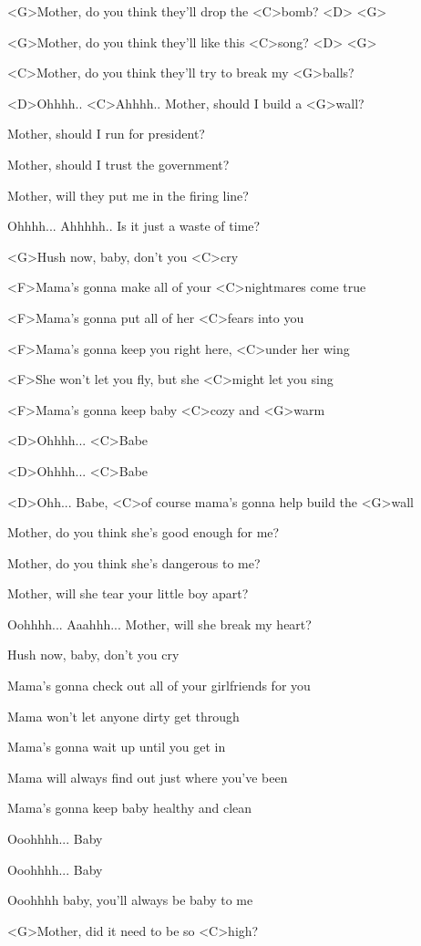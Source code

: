 
\zs
<G>Mother, do you think they'll drop the <C>bomb? <D> <G>

<G>Mother, do you think they'll like this <C>song? <D> <G> 

<C>Mother, do you think they'll try to break my <G>balls?

<D>Ohhhh.. <C>Ahhhh.. Mother, should I build a <G>wall?
\ks

\zs
Mother, should I run for president?

Mother, should I trust the government?

Mother, will they put me in the firing line?

Ohhhh... Ahhhhh.. Is it just a waste of time?
\ks

\zr
<G>Hush now, baby, don't you <C>cry

<F>Mama's gonna make all of your <C>nightmares come true

<F>Mama's gonna put all of her <C>fears into you

<F>Mama's gonna keep you right here, <C>under her wing

<F>She won't let you fly, but she <C>might let you sing

<F>Mama's gonna keep baby <C>cozy and <G>warm

<D>Ohhhh... <C>Babe

<D>Ohhhh... <C>Babe

<D>Ohh... Babe, <C>of course mama's gonna help build the <G>wall
\kr

\zs
Mother, do you think she's good enough for me?

Mother, do you think she's dangerous to me?

Mother, will she tear your little boy apart?

Oohhhh... Aaahhh... Mother, will she break my heart?
\ks

\zr
Hush now, baby, don't you cry

Mama's gonna check out all of your girlfriends for you

Mama won't let anyone dirty get through

Mama's gonna wait up until you get in

Mama will always find out just where you've been

Mama's gonna keep baby healthy and clean

Ooohhhh... Baby

Ooohhhh... Baby

Ooohhhh baby, you'll always be baby to me

<G>Mother, did it need to be so <C>high?
\kr

\kp

